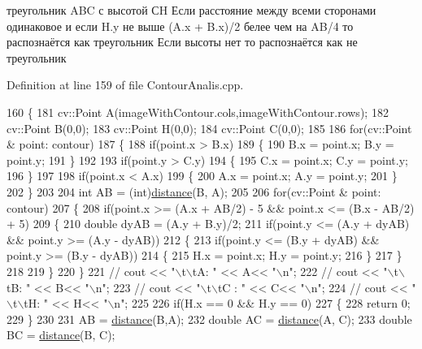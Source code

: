 треугольник A\+B\+C с высотой С\+H Если расстояние между всеми сторонами одинаковое и если H.\+y не выше (A.\+x + B.\+x)/2 белее чем на A\+B/4 то распознаётся как треугольник Если высоты нет то распознаётся как не треугольник

Definition at line 159 of file Contour\+Analis.\+cpp.


\begin{DoxyCode}
160 \{
181     cv::Point A(imageWithContour.cols,imageWithContour.rows);
182     cv::Point B(0,0);
183     cv::Point H(0,0);
184     cv::Point C(0,0);
185 
186     \textcolor{keywordflow}{for}(cv::Point & point: contour)
187     \{
188         \textcolor{keywordflow}{if}(point.x > B.x)
189         \{
190             B.x = point.x; B.y = point.y;
191         \}
192 
193         \textcolor{keywordflow}{if}(point.y > C.y)
194         \{
195             C.x = point.x; C.y = point.y;
196         \}
197 
198         \textcolor{keywordflow}{if}(point.x < A.x)
199         \{
200             A.x = point.x; A.y = point.y;
201         \}
202     \}
203 
204     \textcolor{keywordtype}{int} AB = (int)\hyperlink{class_contour_analis_a4f99f88069c6a746805275d21acdf5b2}{distance}(B, A);
205 
206     \textcolor{keywordflow}{for}(cv::Point & point: contour)
207     \{
208         \textcolor{keywordflow}{if}(point.x >= (A.x + AB/2) - 5 && point.x <= (B.x - AB/2) + 5)
209         \{
210             \textcolor{keywordtype}{double} dyAB = (A.y + B.y)/2;
211             \textcolor{keywordflow}{if}(point.y <= (A.y + dyAB) && point.y >= (A.y - dyAB))
212             \{
213                 \textcolor{keywordflow}{if}(point.y <= (B.y + dyAB) && point.y >= (B.y - dyAB))
214                 \{
215                    H.x = point.x; H.y = point.y;
216                 \}
217             \}
218 
219         \}
220     \}
221 \textcolor{comment}{//    cout << "\(\backslash\)t\(\backslash\)tA: " << A<< "\(\backslash\)n";}
222 \textcolor{comment}{//    cout << "\(\backslash\)t\(\backslash\)tB: " << B<< "\(\backslash\)n";}
223 \textcolor{comment}{//    cout << "\(\backslash\)t\(\backslash\)tC : " << C<< "\(\backslash\)n";}
224 \textcolor{comment}{//    cout << "\(\backslash\)t\(\backslash\)tH: " << H<< "\(\backslash\)n";}
225 
226     \textcolor{keywordflow}{if}(H.x == 0 && H.y == 0)
227     \{
228         \textcolor{keywordflow}{return} 0;
229     \}
230 
231     AB = \hyperlink{class_contour_analis_a4f99f88069c6a746805275d21acdf5b2}{distance}(B,A);
232     \textcolor{keywordtype}{double} AC = \hyperlink{class_contour_analis_a4f99f88069c6a746805275d21acdf5b2}{distance}(A, C);
233     \textcolor{keywordtype}{double} BC = \hyperlink{class_contour_analis_a4f99f88069c6a746805275d21acdf5b2}{distance}(B, C);

\end{DoxyCode}

